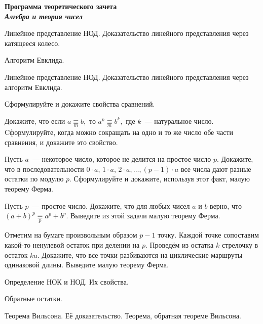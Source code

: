 \begin{center}
\textbf{\Large Программа теоретического зачета}\\
\textbf{\textit{Алгебра и теория чисел}}

\end{center}

\begin{problems}
\item Линейное представление НОД. Доказательство линейного представления через катящееся колесо.

\item Алгоритм Евклида.

\item Линейное представление НОД. Доказательство линейного представления через алгоритм Евклида.

\item Сформулируйте и докажите свойства сравнений.

\item Докажите, что если $a  \mathop{\equiv}\limits_m b,$   то $a^k  \mathop{\equiv}\limits_m b^k,$  где $k$~--- натуральное число. Cформулируйте, когда можно сокращать на одно и то же число обе части сравнения, и докажите это свойство.

\item Пусть $a$~--- некоторое число, которое не делится на простое число $p$. Докажите, что в последовательности $0\cdot a$, $1\cdot a$, $2\cdot a,\dots, (p-1)\cdot a$ все числа дают разные остатки по модулю $p$. Сформулируйте и докажите, используя этот факт, малую теорему Ферма.

\item Пусть $p$~--- простое число. Докажите, что для любых чисел $a$ и $b$ верно, что $(a+b)^p \mathop{\equiv}\limits_p a^p+b^p$. Выведите из этой задачи малую теорему Ферма.

\item Отметим на бумаге произвольным образом $p-1$ точку. Каждой точке сопоставим какой-то ненулевой остаток при делении на $p$. Проведём из остатка $k$ стрелочку в остаток $ka$. Докажите, что все точки разбиваются на  циклические маршруты одинаковой длины. Выведите малую теорему Ферма.

\item Определение НОК и НОД. Их свойства. 

\item Обратные остатки.

\item Теорема Вильсона. Её доказательство. Теорема, обратная теореме Вильсона.
\end{problems}

